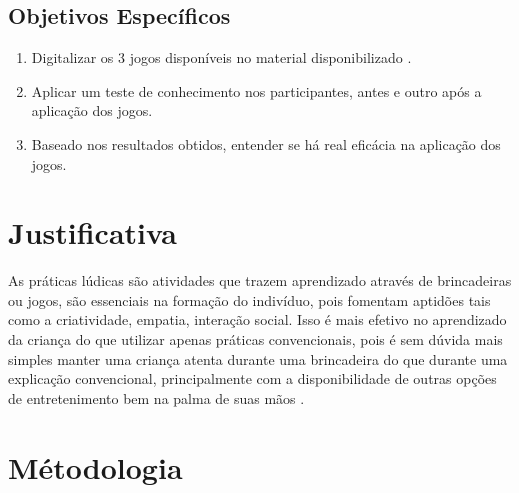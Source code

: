        \subsection{Objetivos Específicos}

            \begin{enumerate}[noitemsep,nosep,labelindent=\parindent,leftmargin=*,label={\alph*}) ]
                \item Digitalizar os 3 jogos disponíveis no material disponibilizado \cite{Educacao_financeira_nas_escolas}.
                \item Aplicar um teste de conhecimento nos participantes, antes e outro após a aplicação dos jogos.
                \item Baseado nos resultados obtidos, entender se há real eficácia na aplicação dos jogos.
            \end{enumerate}

    \section{Justificativa}

        As práticas lúdicas são atividades que trazem aprendizado através de brincadeiras ou jogos, são essenciais na
        formação do indivíduo, pois fomentam aptidões tais como a criatividade, empatia, interação social. Isso é mais
        efetivo no aprendizado da criança do que utilizar apenas práticas convencionais, pois é sem dúvida mais simples
        manter uma criança atenta durante uma brincadeira do que durante uma explicação convencional, principalmente com
        a disponibilidade de outras opções de entretenimento bem na palma de suas mãos \cite{Santos_Thayna_da_silva_2021}.

    \section{Métodologia}